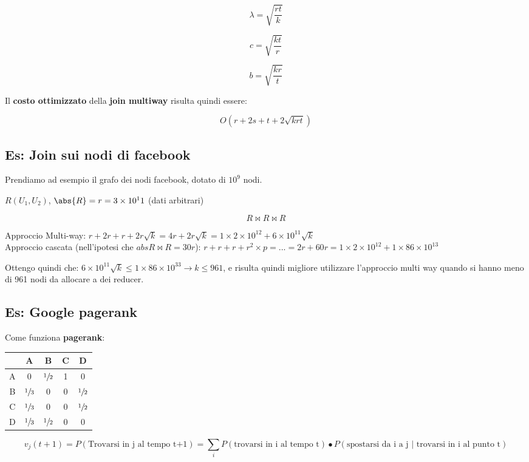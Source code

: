 \documentclass[\main/main.tex]{subfiles}
\begin{document}
\[
	\lambda = \sqrt{\dfrac{rt}{k}}
\]

\[
	c = \sqrt{\dfrac{kt}{r}}
\]

\[
	b = \sqrt{\dfrac{kr}{t}}
\]

Il \textbf{costo ottimizzato} della \textbf{join multiway} risulta quindi essere:

\[
	O(r+2s+t+2\sqrt{krt})
\]

\subsection{Es: Join sui nodi di facebook}
Prendiamo ad esempio il grafo dei nodi facebook, dotato di $10^9$ nodi.

$R(U_1, U_2)$, $\abs{R} = r = 3\times10^11$ (dati arbitrari)

\[
	R\Join R \Join R
\]

Approccio Multi-way: $r+2r + r + 2r\sqrt{k} = 4r + 2r\sqrt{k} = 1\times 2\times 10^12 + 6\times 10^11 \sqrt{k}$
\\
Approccio cascata (nell'ipotesi che $abs{R \Join R} = 30r$): $r + r + r + r^2\times p = ... = 2r + 60r = 1 \times 2 \times 10^12 + 1\times 86 \times 10^13$

Ottengo quindi che: $6\times 10^11 \sqrt{k} \leq 1\times 86 \times 10^33 \longrightarrow k \leq 961$, e risulta quindi migliore utilizzare l'approccio multi way quando si hanno meno di 961 nodi da allocare a dei reducer.

\subsection{Es: Google pagerank}
Come funziona \textbf{pagerank}:

\begin{center}
\begin{tabular}{ |c|c|c|c|c| } 
 \hline
  & A & B & C & D \\ 
 \hline
 A & 0 & $\sfrac{1}{2}$ & 1 & 0 \\ 
 \hline
 B & $\sfrac{1}{3}$ & 0 & 0 & $\sfrac{1}{2}$ \\ 
 \hline
 C & $\sfrac{1}{3}$ & 0 & 0 & $\sfrac{1}{2}$ \\ 
 \hline
 D & $\sfrac{1}{3}$ & $\sfrac{1}{2}$ & 0 & 0 \\ 
 \hline
\end{tabular}
\end{center}

\[
	v_j(t+1) = P(\text{Trovarsi in j al tempo t+1}) = \sum_i P (\text{trovarsi in i al tempo t})\bullet P(\text{spostarsi da i a j | trovarsi in i al punto t})
\]
\end{document}
